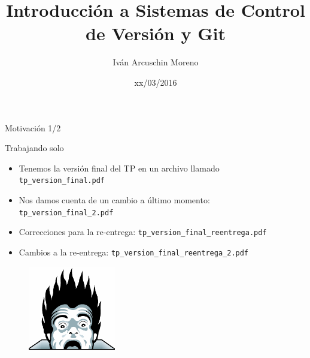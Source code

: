 \documentclass{beamer}
\title[SCV y Git]{Introducción a Sistemas de Control de Versión y Git}
\author[Iván Arcuschin]{Iván Arcuschin Moreno}
\institute{DC - FCEyN - UBA}
\date{xx/03/2016}
\begin{document}
\begin{frame}
  \titlepage
\end{frame}

\begin{frame}{Motivación 1/2}

    \begin{block}{Trabajando solo}
        \begin{itemize}
            \item Tenemos la versión final del TP en un archivo llamado \texttt{tp\_version\_final.pdf}
            \pause
            \item Nos damos cuenta de un cambio a último momento: \texttt{tp\_version\_final\_2.pdf}
            \pause
            \item Correcciones para la re-entrega: \texttt{tp\_version\_final\_reentrega.pdf}
            \pause
            \item Cambios a la re-entrega: \texttt{tp\_version\_final\_reentrega\_2.pdf}
        \end{itemize}
    \end{block}

    \pause
    \begin{figure}[ht]
        \begin{center}
            \includegraphics[height=1.5in]{images/horror.png}
        \end{center}
    \end{figure}

\end{frame}
\end{document}
